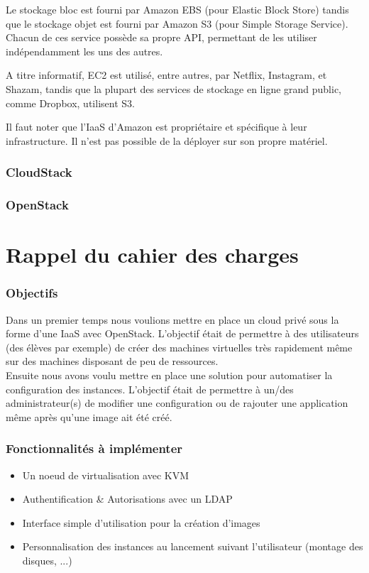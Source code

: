 \documentclass{report}
\begin{document}
Le stockage bloc est fourni par Amazon EBS (pour Elastic Block Store) tandis que le stockage objet est fourni par Amazon S3 (pour Simple Storage Service). Chacun de ces service possède sa propre API, permettant de les utiliser indépendamment les uns des autres.

A titre informatif, EC2 est utilisé, entre autres, par Netflix, Instagram, et Shazam, tandis que la plupart des services de stockage en ligne grand public, comme Dropbox, utilisent S3.

Il faut noter que l'IaaS d'Amazon est propriétaire et spécifique à leur infrastructure. Il n'est pas possible de la déployer sur son propre matériel.

\subsubsection{CloudStack}

\subsubsection{OpenStack}

\section{Rappel du cahier des charges}
\subsubsection{Objectifs}
Dans un premier temps nous voulions mettre en place un cloud privé sous la forme d'une IaaS avec OpenStack. L'objectif était de permettre à des utilisateurs (des élèves par exemple) de créer des machines virtuelles très rapidement même sur des machines disposant de peu de ressources.\\

Ensuite nous avons voulu mettre en place une solution pour automatiser la configuration des instances. L'objectif était de permettre à un/des administrateur(s) de modifier une configuration ou de rajouter une application même après qu'une image ait été créé.

\subsubsection{Fonctionnalités à implémenter}
\begin{itemize}
\item Un noeud de virtualisation avec KVM
\item Authentification \& Autorisations avec un LDAP
\item Interface simple d'utilisation pour la création d'images
\item Personnalisation des instances au lancement suivant l'utilisateur (montage des disques, ...)
\end{itemize}
\end{document}
